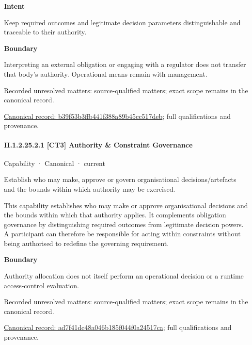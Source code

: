 \textbf{Intent}



Keep required outcomes and legitimate decision parameters distinguishable and traceable to their authority.



\textbf{Boundary}



Interpreting an external obligation or engaging with a regulator does not transfer that body's authority. Operational means remain with management.


{\small Recorded unresolved matters: source-qualified matters; exact scope remains in the canonical record.}\par
{\footnotesize \href{../../../../continuum/strategy/capability/b39f53b3ffb441f388a89b45cc517deb.md}{Canonical record: b39f53b3ffb441f388a89b45cc517deb}; full qualifications and provenance.}\par
\paragraph*{II.1.2.25.2.1 [CT3] Authority \& Constraint Governance}
\label{navigation:II.1.2.25.2.1}

\label{element:ad7f41dc48a046b185f044f0a24517ca}
{\small Capability · Canonical · current}\par

Establish who may make, approve or govern organisational decisions/artefacts and the bounds within which authority may be exercised.



This capability establishes who may make or approve organisational decisions and the bounds within which that authority applies. It complements obligation governance by distinguishing required outcomes from legitimate decision powers. A participant can therefore be responsible for acting within constraints without being authorised to redefine the governing requirement.



\textbf{Boundary}



Authority allocation does not itself perform an operational decision or a runtime access-control evaluation.


{\small Recorded unresolved matters: source-qualified matters; exact scope remains in the canonical record.}\par
{\footnotesize \href{../../../../continuum/strategy/capability/ad7f41dc48a046b185f044f0a24517ca.md}{Canonical record: ad7f41dc48a046b185f044f0a24517ca}; full qualifications and provenance.}\par
